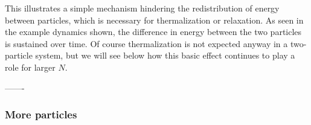 \documentclass[aps,preprintnumbers,onecolumn,amsmath,amssymb,floatfix,pra]{revtex4-1}
\begin{document}
This illustrates a simple mechanism hindering the redistribution of energy between particles, which
is necessary for thermalization or relaxation.  As seen in the example dynamics shown, the
difference in energy between the two particles is sustained over time.  Of course thermalization is
not expected anyway in a two-particle system, but we will see below how this basic effect continues
to play a role for larger $N$.

-------








\subsubsection{More particles}
\end{document}
